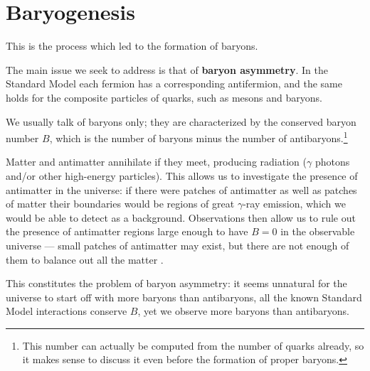 \documentclass[main.tex]{subfiles}
\begin{document}

\section{Baryogenesis}

This is the process which led to the formation of baryons. 

The main issue we seek to address is that of \textbf{baryon asymmetry}. In the Standard Model each fermion has a corresponding antifermion, and the same holds for the composite particles of quarks, such as mesons and baryons. 

We usually talk of baryons only; they are characterized by the conserved baryon number \(B\), which is the number of baryons minus the number of antibaryons.\footnote{This number can actually be computed from the number of quarks already, so it makes sense to discuss it even before the formation of proper baryons.}

Matter and antimatter annihilate if they meet, producing radiation (\(\gamma \) photons and/or other high-energy particles). 
This allows us to investigate the presence of antimatter in the universe: if there were patches of antimatter as well as patches of matter their boundaries would be regions of great \(\gamma \)-ray emission, which we would be able to detect as a background.
Observations then allow us to rule out the presence of antimatter regions large enough to have \(B = 0\) in the observable universe --- small patches of antimatter may exist, but there are not enough of them to balance out all the matter \cite[]{cohenMatterAntimatterUniverse1998}. 

This constitutes the problem of baryon asymmetry: it seems unnatural for the universe to start off with more baryons than antibaryons, all the known Standard Model interactions conserve \(B\), yet we observe more baryons than antibaryons.

\end{document}

